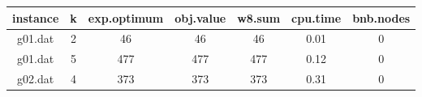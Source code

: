 \begin{tabular}{ c | c | c | c | c | c | c }
	instance & k & exp.optimum & obj.value & w8.sum & cpu.time & bnb.nodes \\ 
	\hline
	g01.dat & 2 & 46 & 46 & 46 & 0.01 & 0 \\
	g01.dat & 5 & 477 & 477 & 477 & 0.12 & 0 \\
	g02.dat & 4 & 373 & 373 & 373 & 0.31 & 0 \\
\end{tabular}
